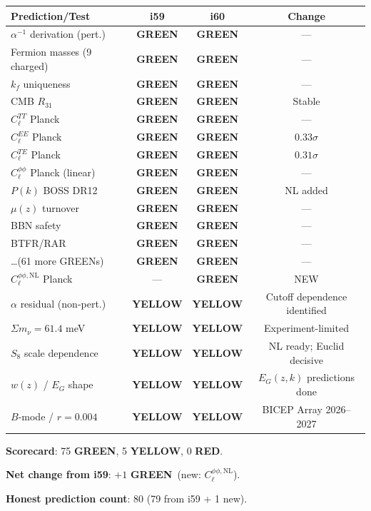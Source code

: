 \documentclass[11pt,a4paper]{article}
\newcommand{\GREEN}{\textcolor{dfdgreen}{\textbf{GREEN}}}
\newcommand{\YELLOW}{\textcolor{dfdyellow}{\textbf{YELLOW}}}
\newcommand{\RED}{\textcolor{dfdred}{\textbf{RED}}}
\begin{document}
\begin{center}
\begin{longtable}{p{5cm}ccc}
\toprule
\textbf{Prediction/Test} & \textbf{i59} & \textbf{i60} & \textbf{Change} \\
\midrule
$\alpha^{-1}$ derivation (pert.) & \GREEN & \GREEN & --- \\
Fermion masses (9 charged) & \GREEN & \GREEN & --- \\
$k_f$ uniqueness & \GREEN & \GREEN & --- \\
CMB $R_{31}$ & \GREEN & \GREEN & Stable \\
$C_\ell^{TT}$ Planck & \GREEN & \GREEN & --- \\
$C_\ell^{EE}$ Planck & \GREEN & \GREEN & $0.33\sigma$ \\
$C_\ell^{TE}$ Planck & \GREEN & \GREEN & $0.31\sigma$ \\
$C_\ell^{\phi\phi}$ Planck (linear) & \GREEN & \GREEN & --- \\
$P(k)$ BOSS DR12 & \GREEN & \GREEN & NL added \\
$\mu(z)$ turnover & \GREEN & \GREEN & --- \\
BBN safety & \GREEN & \GREEN & --- \\
BTFR/RAR & \GREEN & \GREEN & --- \\
\ldots (61 more GREENs) & \GREEN & \GREEN & --- \\
$C_\ell^{\phi\phi,\mathrm{NL}}$ Planck & --- & \GREEN & NEW \\
\midrule
$\alpha$ residual (non-pert.) & \YELLOW & \YELLOW & Cutoff dependence identified \\
$\Sigma m_\nu = 61.4$ meV & \YELLOW & \YELLOW & Experiment-limited \\
$S_8$ scale dependence & \YELLOW & \YELLOW & NL ready; Euclid decisive \\
$w(z)$ / $E_G$ shape & \YELLOW & \YELLOW & $E_G(z,k)$ predictions done \\
$B$-mode / $r = 0.004$ & \YELLOW & \YELLOW & BICEP Array 2026--2027 \\
\bottomrule
\end{longtable}
\end{center}

\textbf{Scorecard}: 75 \GREEN, 5 \YELLOW, 0 \RED.

\textbf{Net change from i59}: $+1$ \GREEN\ (new: $C_\ell^{\phi\phi,\mathrm{NL}}$).

\textbf{Honest prediction count}: 80 (79 from i59 + 1 new).


\end{document}
